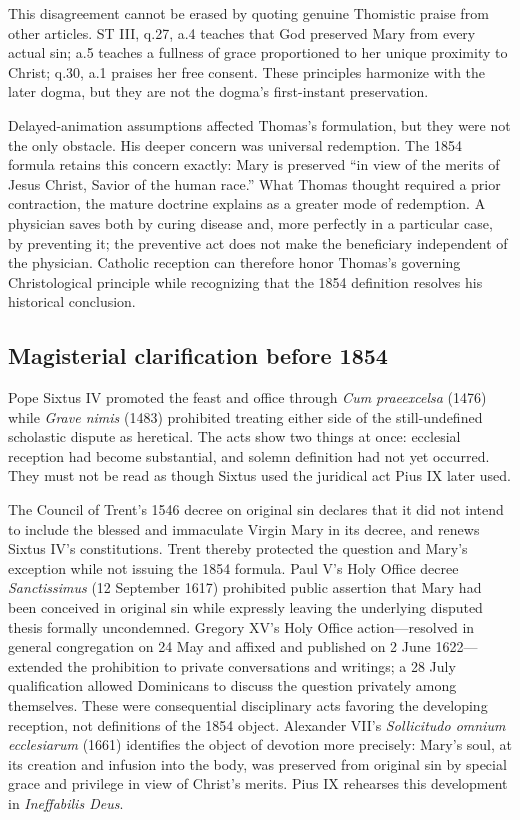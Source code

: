This disagreement cannot be erased by quoting genuine Thomistic praise from other articles. ST III, q.27, a.4 teaches that God preserved Mary from every actual sin; a.5 teaches a fullness of grace proportioned to her unique proximity to Christ; q.30, a.1 praises her free consent. These principles harmonize with the later dogma, but they are not the dogma's first-instant preservation.

Delayed-animation assumptions affected Thomas's formulation, but they were not the only obstacle. His deeper concern was universal redemption. The 1854 formula retains this concern exactly: Mary is preserved ``in view of the merits of Jesus Christ, Savior of the human race.'' What Thomas thought required a prior contraction, the mature doctrine explains as a greater mode of redemption. A physician saves both by curing disease and, more perfectly in a particular case, by preventing it; the preventive act does not make the beneficiary independent of the physician. Catholic reception can therefore honor Thomas's governing Christological principle while recognizing that the 1854 definition resolves his historical conclusion.

\subsection{Magisterial clarification before 1854}

Pope Sixtus IV promoted the feast and office through \emph{Cum praeexcelsa} (1476) while \emph{Grave nimis} (1483) prohibited treating either side of the still-undefined scholastic dispute as heretical. The acts show two things at once: ecclesial reception had become substantial, and solemn definition had not yet occurred. They must not be read as though Sixtus used the juridical act Pius IX later used.

The Council of Trent's 1546 decree on original sin declares that it did not intend to include the blessed and immaculate Virgin Mary in its decree, and renews Sixtus IV's constitutions. Trent thereby protected the question and Mary's exception while not issuing the 1854 formula. Paul V's Holy Office decree \emph{Sanctissimus} (12 September 1617) prohibited public assertion that Mary had been conceived in original sin while expressly leaving the underlying disputed thesis formally uncondemned. Gregory XV's Holy Office action---resolved in general congregation on 24 May and affixed and published on 2 June 1622---extended the prohibition to private conversations and writings; a 28 July qualification allowed Dominicans to discuss the question privately among themselves. These were consequential disciplinary acts favoring the developing reception, not definitions of the 1854 object. Alexander VII's \emph{Sollicitudo omnium ecclesiarum} (1661) identifies the object of devotion more precisely: Mary's soul, at its creation and infusion into the body, was preserved from original sin by special grace and privilege in view of Christ's merits. Pius IX rehearses this development in \emph{Ineffabilis Deus}.


